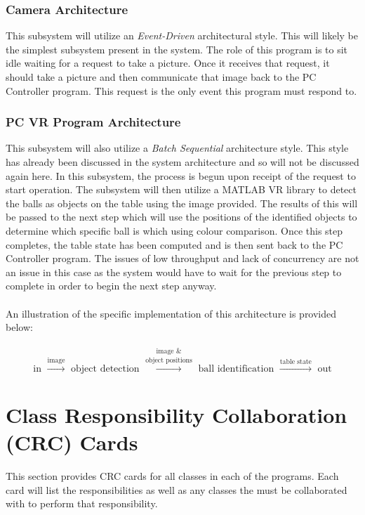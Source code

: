 \documentclass[titlepage]{article}
\begin{document}
\subsubsection{Camera Architecture}
This subsystem will utilize an \textit{Event-Driven} architectural style. This will likely be the simplest subsystem present in the system. The role of this program is to sit idle waiting for a request to take a picture. Once it receives that request, it should take a picture and then communicate that image back to the PC Controller program. This request is the only event this program must respond to.
\subsubsection{PC VR Program Architecture}
This subsystem will also utilize a \textit{Batch Sequential} architecture style. This style has already been discussed in the system architecture and so will not be discussed again here. In this subsystem, the process is begun upon receipt of the request to start operation. The subsystem will then utilize a MATLAB VR library to detect the balls as objects on the table using the image provided. The results of this will be passed to the next step which will use the positions of the identified objects to determine which specific ball is which using colour comparison. Once this step completes, the table state has been computed and is then sent back to the PC Controller program. The issues of low throughput and lack of concurrency are not an issue in this case as the system would have to wait for the previous step to complete in order to begin the next step anyway.\\~\\

An illustration of the specific implementation of this architecture is provided below:\\~\\
$$\text{in } \xrightarrow{\text{image}} \text{ object detection } \overset{\text{image \&}}{\xrightarrow{\text{object positions}}} \text{ ball identification } \xrightarrow{\text{table state}} \text{ out}$$
\label{fig:PC VR Architecture}



\section{Class Responsibility Collaboration (CRC) Cards}
This section provides CRC cards for all classes in each of the programs. Each card will list the responsibilities as well as any classes the must be collaborated with to perform that responsibility.
\end{document}
